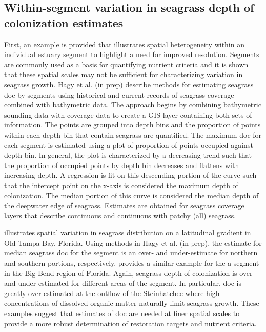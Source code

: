 \documentclass[letterpaper,12pt]{article}\usepackage[]{graphicx}\usepackage[]{color}
\begin{document}
\subsection{Within-segment variation in seagrass depth of colonization estimates}

First, an example is provided that illustrates spatial heterogeneity within an individual estuary segment to highlight a need for improved resolution.  Segments are commonly used as a basis for quantifying nutrient criteria and it is shown that these spatial scales  may not be sufficient for characterizing variation in seagrass growth. Hagy et al. (in prep) describe methods for estimating seagrass \ac{doc} by segments using historical and current records of seagrass coverage combined with bathymetric data.  The approach begins by combining bathymetric sounding data with coverage data to create a \ac{GIS} layer containing both sets of information.  The points are grouped into depth bins and the proportion of points within each depth bin that contain seagrass are quantified.  The maximum \ac{doc} for each segment is estimated using a plot of proportion of points occupied against depth bin.  In general, the plot is characterized by a decreasing trend such that the proportion of occupied points by depth bin decreases and flattens with increasing depth.  A regression is fit on this descending portion of the curve such that the intercept point on the x-axis is considered the maximum depth of colonization.  The median portion of this curve is considered the median depth of the deepwater edge of seagrass.  Estimates are obtained for seagrass coverage layers that describe continuous and continuous with patchy (all) seagrass.  

 illustrates spatial variation in seagrass distribution on a latitudinal gradient in Old Tampa Bay, Florida.  Using methods in Hagy et al. (in prep), the estimate for median seagrass \ac{doc} for the segment is an over- and under-estimate for northern and southern portions, respectively.   provides a similar example for the a segment in the Big Bend region of Florida.  Again, seagrass depth of colonization is over- and under-estimated for different areas of the segment.  In particular, \ac{doc} is greatly over-estimated at the outflow of the Steinhatchee where high concentrations of dissolved organic matter naturally limit seagrass growth.  These examples suggest that estimates of \ac{doc} are needed at finer spatial scales to provide a more robust determination of restoration targets and nutrient criteria.
\end{document}
